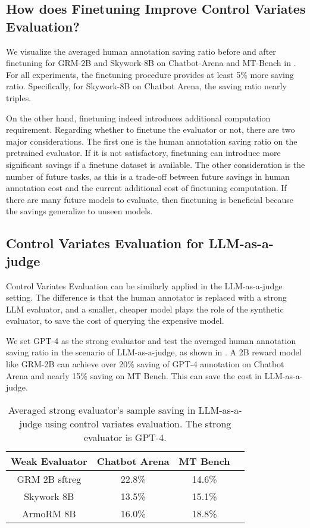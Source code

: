 \subsection{How does Finetuning Improve Control Variates Evaluation?}
\label{sec:exp_finetune}
We visualize the averaged human annotation saving ratio before and after finetuning for GRM-2B and Skywork-8B on Chatbot-Arena and MT-Bench in . For all experiments, the finetuning procedure provides at least 5\% more saving ratio. Specifically, for Skywork-8B on Chatbot Arena, the saving ratio nearly triples. 

On the other hand, finetuning indeed introduces additional computation requirement. Regarding whether to finetune the evaluator or not, there are two major considerations. The first one is the human annotation saving ratio on the pretrained evaluator. If it is not satisfactory, finetuning can introduce more significant savings if a finetune dataset is available. The other consideration is the number of future tasks, as this is a trade-off between future savings in human annotation cost and the current additional cost of finetuning computation. If there are many future models to evaluate, then finetuning is beneficial because the savings generalize to unseen models.  

\subsection{Control Variates Evaluation for LLM-as-a-judge}\label{sec:exp_llm_as_judge}
Control Variates Evaluation can be similarly applied in the LLM-as-a-judge setting. The difference is that the human annotator is replaced with a strong LLM evaluator, and a smaller, cheaper model plays the role of the synthetic evaluator, to save the cost of querying the expensive model. 

We set GPT-4 as the strong evaluator and test the averaged human annotation saving ratio in the scenario of LLM-as-a-judge, as shown in . A 2B reward model like GRM-2B can achieve over 20\% saving of GPT-4 annotation on Chatbot Arena and nearly 15\% saving on MT Bench. This can save the cost in LLM-as-a-judge.
\begin{table}[t]
    \centering
    \caption{Averaged strong evaluator's sample saving in LLM-as-a-judge using control variates evaluation. The strong evaluator is GPT-4.}
    
    \begin{tabular}{cccc}
    \toprule
    Weak Evaluator & Chatbot Arena & MT Bench \\
    \hline
     GRM 2B sftreg & 22.8\% & 14.6\% \\
     Skywork 8B & 13.5\% & 15.1\% \\
     ArmoRM 8B & 16.0\% & 18.8\% \\
     \bottomrule
    \end{tabular}
    \label{tab:ai_save}
\end{table}